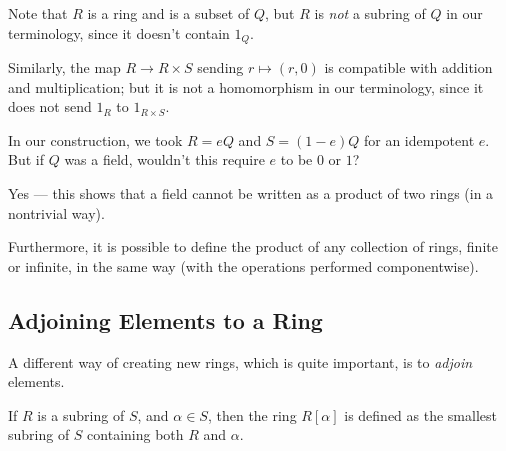 \begin{note}
    Note that $R$ is a ring and is a subset of $Q$, but $R$ is \emph{not} a subring of $Q$ in our terminology, since it doesn't contain $1_Q$. 
    
    Similarly, the map $R \to R \times S$ sending $r \mapsto (r, 0)$ is compatible with addition and multiplication; but it is not a homomorphism in our terminology, since it does not send $1_R$ to $1_{R \times S}$. 
\end{note}




\begin{question}
In our construction, we took $R = eQ$ and $S = (1 - e)Q$ for an idempotent $e$. But if $Q$ was a field, wouldn't this require $e$ to be $0$ or $1$? 
\end{question}

\begin{ans}
Yes --- this shows that a field cannot be written as a product of two rings (in a nontrivial way). 
\end{ans}

Furthermore, it is possible to define the product of any collection of rings, finite or infinite, in the same way (with the operations performed componentwise). 



\subsection{Adjoining Elements to a Ring}

A different way of creating new rings, which is quite important, is to \emph{adjoin} elements. 

\begin{definition}
    If $R$ is a subring of $S$, and $\alpha \in S$, then the ring $R[\alpha]$ is defined as the smallest subring of $S$ containing both $R$ and $\alpha$. 
\end{definition}

